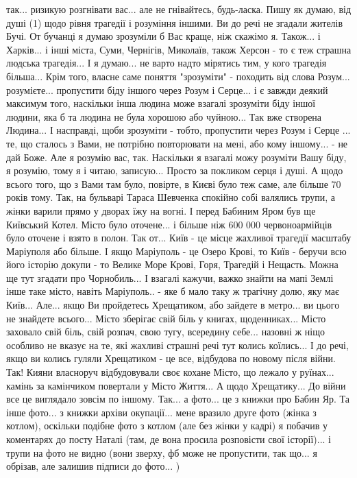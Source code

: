 так... ризикую розгнівати вас... але не гнівайтесь, будь-ласка. Пишу як думаю,
від душі (1) щодо рівня трагедії і розуміння іншими. Ви до речі не згадали
жителів Бучі. От бучанці я думаю зрозуміли б Вас краще, ніж скажімо я. Також...
і Харків... і інші міста, Суми, Чернігів, Миколаїв, також Херсон - то є теж
страшна людська трагедія... І я думаю... не варто надто мірятись тим, у кого
трагедія більша... Крім того, власне саме поняття "зрозуміти" - походить від
слова Розум... розумієте... пропустити біду іншого через Розум і Серце... і є
завжди деякий максимум того, наскільки інша людина може взагалі зрозуміти біду
іншої людини, яка б та людина не була хорошою або чуйною... Так вже створена
Людина... І насправді, щоби зрозуміти - тобто, пропустити через Розум і Серце
... те, що сталось з Вами, не потрібно повторювати на мені, або кому іншому...
- не дай Боже. Але я розумію вас, так. Наскільки я взагалі можу розуміти Вашу
біду, я розумію, тому я і читаю, записую... Просто за покликом серця і душі. А
щодо всього того, що з Вами там було, повірте, в Києві було теж саме, але
більше 70 років тому. Так, на бульварі Тараса Шевченка спокійно собі валялись
трупи, а жінки варили прямо у дворах їжу на вогні. І перед Бабиним Яром був ще
Київський Котел. Місто було оточене... і більше ніж 600 000 червоноармійців
було оточене і взято в полон. Так от... Київ - це місце жахливої трагедії
масштабу Маріуполя або більше. І якщо Маріуполь - це Озеро Крові, то Київ -
беручи всю його історію докупи - то Велике Море Крові, Горя, Трагедій і
Нещасть. Можна ще тут згадати про Чорнобиль... І взагалі кажучи, важко знайти
на мапі Землі інше таке місто, навіть Маріуполь.. - яке б мало таку ж трагічну
долю, яку має Київ... Але... якщо Ви пройдетесь Хрещатиком, або зайдете в
метро... ви цього не знайдете всього... Місто зберігає свій біль у книгах,
щоденниках... Місто заховало свій біль, свій розпач, свою тугу, всередину
себе... назовні ж ніщо особливо не вказує на те, які жахливі страшні речі тут
колись коїлись... І до речі, якщо ви колись гуляли Хрещатиком - це все,
відбудова по новому після війни. Так! Кияни власноруч відбудовували своє кохане
Місто, що лежало у руїнах... камінь за камінчиком повертали у Місто Життя... А
щодо Хрещатику... До війни все це виглядало зовсім по іншому. Так... а фото...
це з книжки про Бабин Яр. Та інше фото... з книжки архіви окупації... мене
вразило друге фото (жінка з котлом), оскільки подібне фото з котлом (але без
жінки у кадрі) я побачив у коментарях до посту Наталі (там, де вона просила
розповісти свої історії)... і трупи на фото не видно (вони зверху, фб може не
пропустити, так що... я обрізав, але залишив підписи до фото... )
